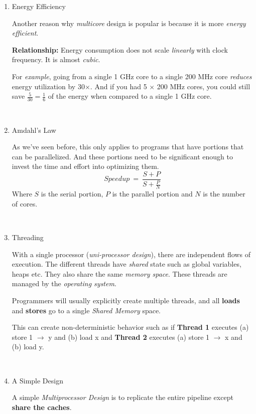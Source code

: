 \documentclass[12pt]{article}
\newenvironment{QandA}{\begin{enumerate}[label=\bfseries\arabic*.]\bfseries}
                      {\end{enumerate}}
\newenvironment{answered}{\par\quad\normalfont}{}
\begin{document}
\begin{QandA}
\ 

\item Energy Efficiency
\begin{answered}
Another reason why \textit{multicore} design is popular is because it is more \textit{energy efficient}. 

\textbf{Relationship:} Energy consumption does not scale \textit{linearly} with clock frequency. It is almost \textit{cubic}. 

For \textit{example}, going from a single 1 GHz core to a single 200 MHz core \textit{reduces} energy utilization by 30$\times$. And if you had 5 $\times$ 200 MHz cores, you could still save $\frac{5}{30}=\frac{1}{6}$ of the energy when compared to a single 1 GHz core. 
\end{answered}

\ 

\item Amdahl's Law
\begin{answered}
As we've seen before, this only applies to programs that have portions that can be parallelized. And these portions need to be significant enough to invest the time and effort into optimizing them. 
\begin{equation*}
Speedup\ =\ \frac{S+P}{S+\frac{P}{N}}
\end{equation*}
Where $S$ is the serial portion, $P$ is the parallel portion and $N$ is the number of cores. 
\end{answered}

\ 

\item Threading
\begin{answered}
With a single processor (\textit{uni-processor design}), there are independent flows of execution. The different threads have \textit{shared} state such as global variables, heaps etc. They also share the same \textit{memory space}. These threads are managed by the \textit{operating system}. 

Programmers will usually explicitly create multiple threads, and all \textbf{loads} and \textbf{stores} go to a single \textit{Shared Memory} space.

This can create non-deterministic behavior such as if \textbf{Thread 1} executes (a) store 1 $\rightarrow$ y and (b) load x and \textbf{Thread 2} executes (a) store 1 $\rightarrow$ x and (b) load y. 
\end{answered}

\ 

\item A Simple Design
\begin{answered}
A simple \textit{Multiprocessor Design} is  to replicate the entire pipeline except \textbf{share the caches}. 


\end{answered}
\end{QandA}
\end{document}
